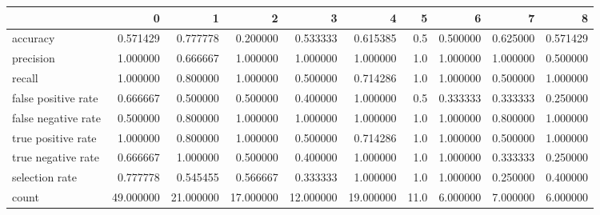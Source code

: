 \begin{tabular}{lrrrrrrrrr}
\toprule
{} &          0 &          1 &          2 &          3 &          4 &     5 &         6 &         7 &         8 \\
\midrule
accuracy            &   0.571429 &   0.777778 &   0.200000 &   0.533333 &   0.615385 &   0.5 &  0.500000 &  0.625000 &  0.571429 \\
precision           &   1.000000 &   0.666667 &   1.000000 &   1.000000 &   1.000000 &   1.0 &  1.000000 &  1.000000 &  0.500000 \\
recall              &   1.000000 &   0.800000 &   1.000000 &   0.500000 &   0.714286 &   1.0 &  1.000000 &  0.500000 &  1.000000 \\
false positive rate &   0.666667 &   0.500000 &   0.500000 &   0.400000 &   1.000000 &   0.5 &  0.333333 &  0.333333 &  0.250000 \\
false negative rate &   0.500000 &   0.800000 &   1.000000 &   1.000000 &   1.000000 &   1.0 &  1.000000 &  0.800000 &  1.000000 \\
true positive rate  &   1.000000 &   0.800000 &   1.000000 &   0.500000 &   0.714286 &   1.0 &  1.000000 &  0.500000 &  1.000000 \\
true negative rate  &   0.666667 &   1.000000 &   0.500000 &   0.400000 &   1.000000 &   1.0 &  1.000000 &  0.333333 &  0.250000 \\
selection rate      &   0.777778 &   0.545455 &   0.566667 &   0.333333 &   1.000000 &   1.0 &  1.000000 &  0.250000 &  0.400000 \\
count               &  49.000000 &  21.000000 &  17.000000 &  12.000000 &  19.000000 &  11.0 &  6.000000 &  7.000000 &  6.000000 \\
\bottomrule
\end{tabular}
